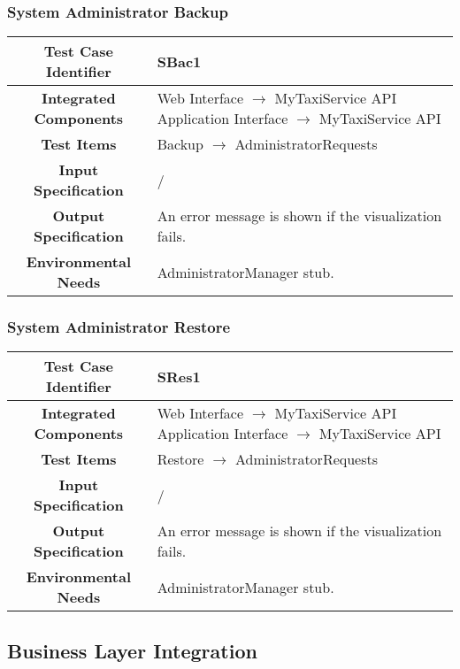 \documentclass[11pt, a4paper,titlepage]{article}
\begin{document}
	\subsubsection{System Administrator Backup}
	\begin{tabularx}{\textwidth}{| c|X|}
		\hline \textbf{Test Case Identifier} & \label{SBac1}SBac1 \\
		\hline \textbf{Integrated Components} & Web Interface $\rightarrow $ MyTaxiService API \newline 
		Application Interface $\rightarrow $ MyTaxiService API \\
		\hline \textbf{Test Items} & Backup $\rightarrow $ AdministratorRequests \\
		\hline \textbf{Input Specification} & / \\
		\hline \textbf{Output Specification} & An error message is shown if the visualization fails. \\
		\hline \textbf{Environmental Needs} & AdministratorManager stub. \\
		\hline
	\end{tabularx}
	\newline
	\newline
	\subsubsection{System Administrator Restore}
	\begin{tabularx}{\textwidth}{| c|X|}
		\hline \textbf{Test Case Identifier} & \label{SRes1}SRes1 \\
		\hline \textbf{Integrated Components} & Web Interface $\rightarrow $ MyTaxiService API \newline 
		Application Interface $\rightarrow $ MyTaxiService API \\
		\hline \textbf{Test Items} & Restore $\rightarrow $ AdministratorRequests \\
		\hline \textbf{Input Specification} & / \\
		\hline \textbf{Output Specification} & An error message is shown if the visualization fails. \\
		\hline \textbf{Environmental Needs} & AdministratorManager stub. \\
		\hline
	\end{tabularx}
	\newpage
	\subsection{Business Layer Integration}
\end{document}
